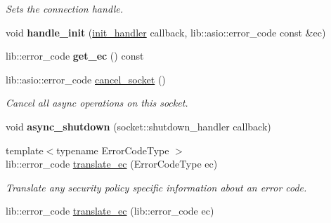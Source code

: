 \begin{DoxyCompactItemize}
\begin{DoxyCompactList}\small\item\em Sets the connection handle. \end{DoxyCompactList}\item 
\mbox{\label{classwebsocketpp_1_1transport_1_1asio_1_1tls__socket_1_1connection_a83d9c15ccd470b56d4ed55086a9286cb}} 
void {\bfseries handle\+\_\+init} (\mbox{\hyperlink{namespacewebsocketpp_1_1transport_aeae75e675c1a334b3b33ab7120b480a5}{init\+\_\+handler}} callback, lib\+::asio\+::error\+\_\+code const \&ec)
\item 
\mbox{\label{classwebsocketpp_1_1transport_1_1asio_1_1tls__socket_1_1connection_aa62d8c4c31652f674bed127e542ffc4f}} 
lib\+::error\+\_\+code {\bfseries get\+\_\+ec} () const
\item 
lib\+::asio\+::error\+\_\+code \mbox{\hyperlink{classwebsocketpp_1_1transport_1_1asio_1_1tls__socket_1_1connection_af1fb297f14e4d010ce4a7aa352509611}{cancel\+\_\+socket}} ()
\begin{DoxyCompactList}\small\item\em Cancel all async operations on this socket. \end{DoxyCompactList}\item 
\mbox{\label{classwebsocketpp_1_1transport_1_1asio_1_1tls__socket_1_1connection_a2f1935691c0b018206533ce3e1d4058f}} 
void {\bfseries async\+\_\+shutdown} (socket\+::shutdown\+\_\+handler callback)
\item 
{\footnotesize template$<$typename Error\+Code\+Type $>$ }\\lib\+::error\+\_\+code \mbox{\hyperlink{classwebsocketpp_1_1transport_1_1asio_1_1tls__socket_1_1connection_a64279c2aa16298902ba5bd3177ec3b5b}{translate\+\_\+ec}} (Error\+Code\+Type ec)
\begin{DoxyCompactList}\small\item\em Translate any security policy specific information about an error code. \end{DoxyCompactList}\item 
lib\+::error\+\_\+code \mbox{\hyperlink{classwebsocketpp_1_1transport_1_1asio_1_1tls__socket_1_1connection_a87860f93e9837fc0f86844bcf86ee83c}{translate\+\_\+ec}} (lib\+::error\+\_\+code ec)
\end{DoxyCompactItemize}



